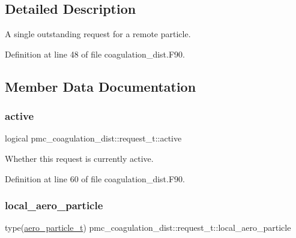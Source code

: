 \subsection{Detailed Description}
A single outstanding request for a remote particle. 

Definition at line 48 of file coagulation\+\_\+dist.\+F90.



\subsection{Member Data Documentation}
\mbox{\label{structpmc__coagulation__dist_1_1request__t_a979934a887e662d8f32e8042aae139bd}} 
\subsubsection{\texorpdfstring{active}{active}}
{\footnotesize\ttfamily logical pmc\+\_\+coagulation\+\_\+dist\+::request\+\_\+t\+::active}



Whether this request is currently active. 



Definition at line 60 of file coagulation\+\_\+dist.\+F90.

\mbox{\label{structpmc__coagulation__dist_1_1request__t_a31ee25126fc60521c2c352b26fadedba}} 
\subsubsection{\texorpdfstring{local\+\_\+aero\+\_\+particle}{local\_aero\_particle}}
{\footnotesize\ttfamily type(\mbox{\hyperlink{structpmc__aero__particle_1_1aero__particle__t}{aero\+\_\+particle\+\_\+t}}) pmc\+\_\+coagulation\+\_\+dist\+::request\+\_\+t\+::local\+\_\+aero\+\_\+particle}



